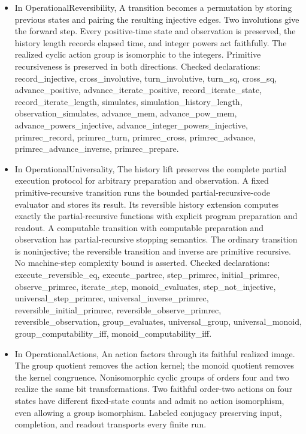 \documentclass[11pt,a4paper]{article}
\newcommand{\lean}[1]{{\ttfamily\small
  \let\leanunderscore\_\def\_{\leanunderscore\allowbreak}#1}}
\begin{document}
\begin{itemize}[leftmargin=1.4em,itemsep=1pt]
\item {\raggedright In \lean{OperationalReversibility}, A transition becomes a permutation by storing previous states and pairing the resulting injective edges. Two involutions give the forward step. Every positive-time state and observation is preserved, the history length records elapsed time, and integer powers act faithfully. The realized cyclic action group is isomorphic to the integers. Primitive recursiveness is preserved in both directions.
Checked declarations: \lean{record\_injective}, \lean{cross\_involutive}, \lean{turn\_involutive}, \lean{turn\_sq}, \lean{cross\_sq}, \lean{advance\_positive}, \lean{advance\_iterate\_positive}, \lean{record\_iterate\_state}, \lean{record\_iterate\_length}, \lean{simulates}, \lean{simulation\_history\_length}, \lean{observation\_simulates}, \lean{advance\_mem}, \lean{advance\_pow\_mem}, \lean{advance\_powers\_injective}, \lean{advance\_integer\_powers\_injective}, \lean{primrec\_record}, \lean{primrec\_turn}, \lean{primrec\_cross}, \lean{primrec\_advance}, \lean{primrec\_advance\_inverse}, \lean{primrec\_prepare}.\par}
\item {\raggedright In \lean{OperationalUniversality}, The history lift preserves the complete partial execution protocol for arbitrary preparation and observation. A fixed primitive-recursive transition runs the bounded partial-recursive-code evaluator and stores its result. Its reversible history extension computes exactly the partial-recursive functions with explicit program preparation and readout. A computable transition with computable preparation and observation has partial-recursive stopping semantics. The ordinary transition is noninjective; the reversible transition and inverse are primitive recursive. No machine-step complexity bound is asserted.
Checked declarations: \lean{execute\_reversible\_eq}, \lean{execute\_partrec}, \lean{step\_primrec}, \lean{initial\_primrec}, \lean{observe\_primrec}, \lean{iterate\_step}, \lean{monoid\_evaluates}, \lean{step\_not\_injective}, \lean{universal\_step\_primrec}, \lean{universal\_inverse\_primrec}, \lean{reversible\_initial\_primrec}, \lean{reversible\_observe\_primrec}, \lean{reversible\_observation}, \lean{group\_evaluates}, \lean{universal\_group}, \lean{universal\_monoid}, \lean{group\_computability\_iff}, \lean{monoid\_computability\_iff}.\par}
\item {\raggedright In \lean{OperationalActions}, An action factors through its faithful realized image. The group quotient removes the action kernel; the monoid quotient removes the kernel congruence. Nonisomorphic cyclic groups of orders four and two realize the same bit transformations. Two faithful order-two actions on four states have different fixed-state counts and admit no action isomorphism, even allowing a group isomorphism. Labeled conjugacy preserving input, completion, and readout transports every finite run.
}
\end{itemize}
\end{document}
